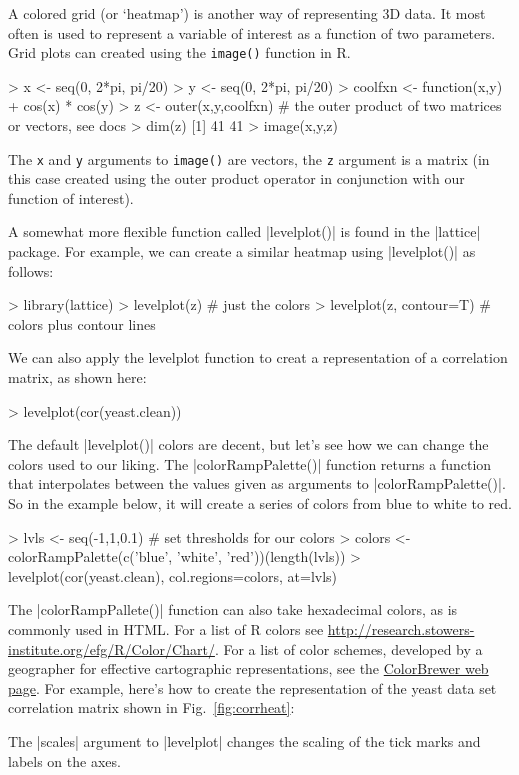 A colored grid (or `heatmap') is another way of representing 3D data. It
most often is used to represent a variable of interest as a function of
two parameters. Grid plots can created using the \lstinline!image()!
function in R.

\begin{R}
> x <- seq(0, 2*pi, pi/20)
> y <- seq(0, 2*pi, pi/20)
> coolfxn <- function(x,y){
+    cos(x) * cos(y)}
> z <- outer(x,y,coolfxn) # the outer product of two matrices or vectors, see docs
> dim(z)
[1] 41 41
> image(x,y,z)
\end{R}
The \lstinline!x! and \lstinline!y! arguments to \lstinline!image()! are
vectors, the \lstinline!z! argument is a matrix (in this case created
using the outer product operator in conjunction with our function of
interest).

A somewhat more flexible function called |levelplot()| is found in the |lattice| package. For example, we can create a similar heatmap using |levelplot()| as follows:
\begin{R}
> library(lattice)
> levelplot(z)  # just the colors
> levelplot(z, contour=T) # colors plus contour lines
\end{R}
We can also apply the levelplot function to creat a representation of a correlation matrix, as shown here:
\begin{R}
> levelplot(cor(yeast.clean))
\end{R}
The default |levelplot()| colors are decent, but let's see how we can change the colors used to our liking. The |colorRampPalette()| function returns a function that interpolates between the values given as arguments to |colorRampPalette()|. So in the example below, it will create a series of colors from blue to white to red.
\begin{R}
> lvls <- seq(-1,1,0.1)  # set thresholds for our colors
> colors <- colorRampPalette(c('blue', 'white', 'red'))(length(lvls))
> levelplot(cor(yeast.clean), col.regions=colors, at=lvls)
\end{R}
%
The |colorRampPallete()| function can also take hexadecimal colors, as is commonly used in HTML. For a list of R colors see \url{http://research.stowers-institute.org/efg/R/Color/Chart/}.  For a  list of color schemes, developed by a geographer for effective cartographic representations,  see the \href{http://colorbrewer2.org/}{ColorBrewer web page}. For example, here's how to create the representation of the yeast data set correlation matrix shown in Fig.~\ref{fig:corrheat}:
The |scales| argument to |levelplot| changes the scaling of the tick marks and labels on the axes.

